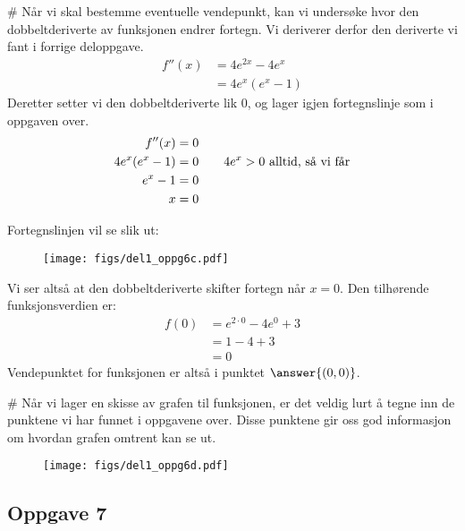 \begin{easylist}[enumerate]
	
	# Når vi skal bestemme eventuelle vendepunkt, kan vi undersøke hvor den dobbeltderiverte av funksjonen endrer fortegn. Vi deriverer derfor den deriverte vi fant i forrige deloppgave. 
	\begin{align*}
		f''(x) & = 4e^{2x} - 4e^x \\
		& = 4e^x(e^x -1)
	\end{align*}
	Deretter setter vi den dobbeltderiverte lik $0$, og lager igjen fortegnslinje som i oppgaven over.
	\begin{align*}
		f''(x) & = 0 \\
		4e^x(e^x-1) & = 0 \qquad \textnormal{$4e^x > 0$ alltid, så vi får}\\ 
		e^x -1 & = 0 \\
		x & = 0
	\end{align*}
	
	Fortegnslinjen vil se slik ut:
	\begin{figure}[ht!]
		\centering
		\texttt{[image: figs/del1\_oppg6c.pdf]}
		\label{fig:del1_oppg6c}
	\end{figure}
	Vi ser altså at den dobbeltderiverte skifter fortegn når $x=0$. 
	Den tilhørende funksjonsverdien er: 
	\begin{align*}
	f(0) & = e^{2 \cdot 0} - 4e^0 + 3\\
	& = 1 -4 +3\\
	& = 0
	\end{align*}	
	Vendepunktet for funksjonen er altså i punktet $\answer{(0,0)}$.
	
	# Når vi lager en skisse av grafen til funksjonen, er det veldig lurt å tegne inn de punktene vi har funnet i oppgavene over. 
	Disse punktene gir oss god informasjon om hvordan grafen omtrent kan se ut. 
	\begin{figure}[ht!]
		\centering
		\texttt{[image: figs/del1\_oppg6d.pdf]}
		\label{fig:del1_oppg6d}
	\end{figure}
\end{easylist}


\subsection*{Oppgave 7}

